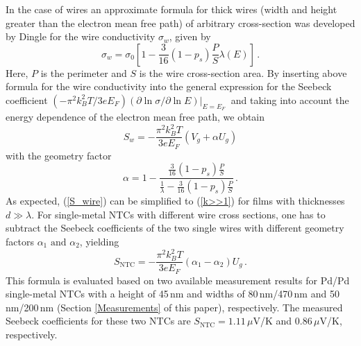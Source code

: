 \documentclass[journal]{IEEEtran}
\newcommand{\mathrmm}[1]{{#1}}
\begin{document}
In the case of wires an approximate formula for thick wires (width and height greater than the electron mean free path) of arbitrary cross-section was developed by Dingle \cite{dingle1950electrical} for the wire conductivity $\sigma_\mathrmm{w}$, given by
\begin{equation}
\sigma_\mathrmm{w} = \sigma_\mathrmm{0} \left[ 1 - \frac{3}{16}(1 - p_s) \frac{P}{S} \lambda(E) \right] \, .
\end{equation}
Here, $P$ is the perimeter and $S$ is the wire cross-section area. By inserting above formula for the wire conductivity into the general expression for the Seebeck coefficient $(-\pi^2 k_\mathrmm{B}^2 T /3e E_\mathrmm{F}) \left(  \partial\ln \sigma /\partial\ln E\right)
|_{E=E_{\mathrmm{F}}} \ $ and taking into account the energy dependence of the electron mean free path, we obtain 
\begin{equation} \label{S_wire}
S_\mathrmm{w} = -\frac{\pi^2 k_\mathrmm{B}^2 T}{3e E_\mathrmm{F}} \left( V_\mathrmm{g} + \alpha U_\mathrmm{g}  \right)
\end{equation}
with the geometry factor 
\begin{equation}
\alpha =  1 - \frac{\frac{3}{16} (1 - p_s) \frac{P}{S}}{\frac{1}{\lambda}  - \frac{3}{16} (1 - p_s) \frac{P}{S}}  \,  .
\end{equation}
As expected, (\ref{S_wire}) can be simplified to (\ref{k>>1}) for films with thicknesses $d\gg \lambda$. For single-metal NTCs with different wire cross sections, one has to subtract the Seebeck coefficients of the two single wires with different geometry factors $\alpha_\mathrm{1} \text{ and } \alpha_\mathrm{2} $, yielding
\begin{equation} \label{S_NTC}
S_\mathrm{NTC} = -\frac{\pi^2 k_\mathrmm{B}^2 T}{3e E_\mathrmm{F}} \left( \alpha_\mathrmm{1} - \alpha_\mathrmm{2}\right) U_\mathrmm{g} \, .
\end{equation} 
This formula is evaluated based on two available measurement results for Pd/Pd single-metal NTCs with a height of 45\,nm and widths of 80\,nm/470\,nm \cite{russer_nanostructured_2015} and 50\,nm/200\,nm (Section \ref{Measurements} of this paper), respectively. The measured Seebeck coefficients for these two NTCs are $S_\mathrm{NTC} = 1.11\,\mu$V/K \cite{russer_nanostructured_2015} and $0.86\,\mu$V/K, respectively.
\end{document}
